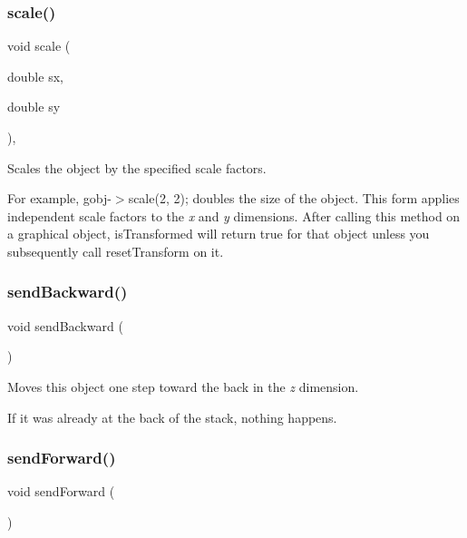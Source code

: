 \subsubsection{\texorpdfstring{scale()}{scale()}\hspace{0.1cm}{\footnotesize\ttfamily [2/2]}}
{\footnotesize\ttfamily void scale (\begin{DoxyParamCaption}\item[{double}]{sx,  }\item[{double}]{sy }\end{DoxyParamCaption})\hspace{0.3cm}{\ttfamily [virtual]}, {\ttfamily [inherited]}}



Scales the object by the specified scale factors. 

For example, {\ttfamily gobj-\/$>$scale(2, 2);} doubles the size of the object. This form applies independent scale factors to the {\itshape x} and {\itshape y} dimensions. After calling this method on a graphical object, {\ttfamily is\+Transformed} will return {\ttfamily true} for that object unless you subsequently call {\ttfamily reset\+Transform} on it. \mbox{\label{classsgl_1_1GObject_ab6747f40313c531c2db32edb5b63b9b7}} 
\subsubsection{\texorpdfstring{send\+Backward()}{sendBackward()}}
{\footnotesize\ttfamily void send\+Backward (\begin{DoxyParamCaption}{ }\end{DoxyParamCaption})\hspace{0.3cm}{\ttfamily [inherited]}}



Moves this object one step toward the back in the {\itshape z} dimension. 

If it was already at the back of the stack, nothing happens. \mbox{\label{classsgl_1_1GObject_a710b3e449c9facba7847c91ab170d281}} 
\subsubsection{\texorpdfstring{send\+Forward()}{sendForward()}}
{\footnotesize\ttfamily void send\+Forward (\begin{DoxyParamCaption}{ }\end{DoxyParamCaption})\hspace{0.3cm}{\ttfamily [inherited]}}



